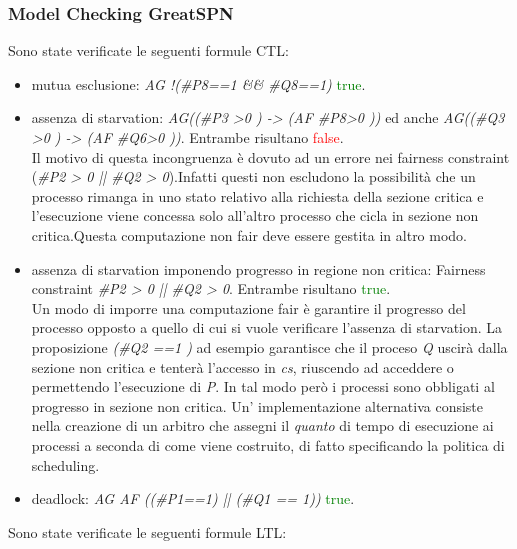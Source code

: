 \documentclass[a4paper]{article}
\begin{document}
\subsubsection{Model Checking GreatSPN}
Sono state verificate le seguenti formule CTL:
\begin{itemize}
	\item mutua esclusione: \textit{AG !(\#P8==1 \&\& \#Q8==1)} \textcolor{green}{true}.
	\item assenza di starvation: \textit{AG((\#P3 >0 ) -> (AF \#P8>0 ))} ed anche \textit{AG((\#Q3 >0 ) -> (AF \#Q6>0 ))}. Entrambe risultano \textcolor{red}{false}.\\
		Il motivo di questa incongruenza è dovuto ad un errore nei fairness constraint (\textit{\#P2 > 0 || \#Q2 > 0}).Infatti questi non escludono la possibilità che un processo rimanga in uno stato relativo alla richiesta della sezione critica e l'esecuzione viene concessa solo all'altro processo che cicla in sezione non critica.Questa computazione non fair deve essere gestita in altro modo.
	\item assenza di starvation imponendo progresso in regione non critica: Fairness constraint \textit{\#P2 > 0 || \#Q2 > 0}. Entrambe risultano \textcolor{green}{true}.\\
		Un modo di imporre una computazione fair è garantire il progresso del processo opposto a quello di cui si vuole verificare l'assenza di starvation. La proposizione \textit{(\#Q2 ==1 )} ad esempio garantisce che il proceso \textit{Q} uscirà dalla sezione non critica e tenterà l'accesso in \textit{cs}, riuscendo ad acceddere o permettendo l'esecuzione di \textit{P}. In tal modo però i processi sono obbligati al progresso in sezione non critica.
		Un' implementazione alternativa consiste nella creazione di un arbitro che assegni il \textit{quanto} di tempo di esecuzione ai processi a seconda di come viene costruito, di fatto specificando la politica di scheduling.
	\item deadlock: \textit{AG AF ((\#P1==1) || (\#Q1 == 1))} \textcolor{green}{true}.
\end{itemize}
Sono state verificate le seguenti formule LTL:
\end{document}
